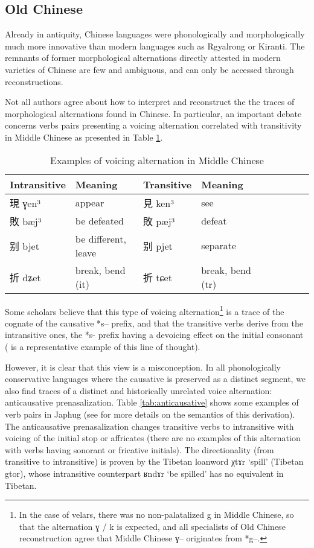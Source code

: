 \documentclass[oldfontcommands,oneside,a4paper,11pt]{article}
\newcommand{\ipa}[1]{{\phon \mbox{#1}}} %
\newcommand{\zh}[1]{{\cn #1}}
\begin{document}
\subsection{Old Chinese}
Already in antiquity, Chinese languages were phonologically and morphologically much more innovative than modern languages such as Rgyalrong or Kiranti. The remnants of former morphological alternations directly attested in modern varieties of Chinese are few and ambiguous, and can only be accessed through reconstructions. 

Not all authors agree about how to interpret and reconstruct the the traces of morphological alternations found in Chinese. In particular, an important debate concerns verbs pairs presenting a voicing alternation correlated with transitivity in Middle Chinese as presented in Table \ref{tab:mc.voicing}.

\begin{table}[h]
\caption{Examples of voicing alternation in Middle Chinese}\label{tab:mc.voicing} \centering
\begin{tabular}{lllllllll} \toprule
Intransitive &Meaning & Transitive&Meaning \\
\midrule
 \zh{現} ɣen³  & appear &  \zh{見} ken³  & see \\
 \zh{敗} bæj³  & be defeated &  \zh{敗} pæj³  & defeat \\
  \zh{别} bjet  & be different, leave &  \zh{别} pjet  & separate \\
    \zh{折} dʑet  & break, bend (it) &  \zh{折} tɕet  & break, bend (tr) \\
\bottomrule
\end{tabular}
\end{table}
Some scholars believe that this type of voicing alternation\footnote{In the case of velars, there was no non-palatalized \ipa{g} in Middle Chinese, so that the alternation  \ipa{ɣ} / \ipa{k} is expected, and all specialists of Old Chinese reconstruction agree that Middle Chinese \ipa{ɣ}-- originates from *g--.} is a trace of the cognate of the causative *\ipa{s--} prefix, and that the transitive verbs derive from the intransitive ones, the *\ipa{s-} prefix having a devoicing effect on the initial consonant (\citealt{mei12caus} is a representative example of this line of thought). 

However, it is clear that this view is a misconception. In all phonologically conservative languages where the causative is preserved as a distinct segment, we also find traces of a distinct and historically unrelated voice alternation: anticausative prenasalization. Table \ref{tab:anticausative} shows some examples of verb pairs in Japhug (see \citealt{jacques12demotion} for more details on the semantics of this derivation). The anticausative prenasalization changes transitive verbs to intransitive with voicing of the initial stop or affricates (there are no examples of this alternation with verbs having sonorant or fricative initials). The directionality (from transitive to intransitive) is proven by the Tibetan loanword \ipa{χtɤr} `spill' (Tibetan \ipa{gtor}), whose intransitive counterpart  \ipa{ʁndɤr} `be spilled' has no equivalent in Tibetan.
\end{document}
